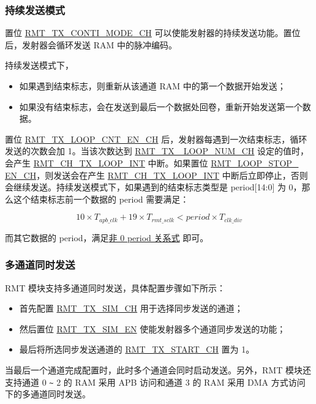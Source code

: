 \documentclass[main\_\_CN.tex]{subfiles}
\begin{document}
\subsubsection{持续发送模式}


置位 \hyperref[fielddesc:RMTTXCONTIMODECHN]{RMT\_TX\_CONTI\_MODE\_CH} 可以使能发射器的持续发送功能。置位后，发射器会循环发送 RAM 中的脉冲编码。

持续发送模式下，
\begin{itemize}
    \item 如果遇到结束标志，则重新从该通道 RAM 中的第一个数据开始发送；
    \item 如果没有结束标志，会在发送到最后一个数据处回卷，重新开始发送第一个数据。
\end{itemize}
置位 \hyperref[fielddesc:RMTTXLOOPCNTENCHN]{RMT\_TX\_LOOP\_CNT\_EN\_CH} 后，发射器每遇到一次结束标志，循环发送的次数会加 1。当该次数达到 \hyperref[fielddesc:RMTTXLOOPNUMCHN]{RMT\_TX \_LOOP\_NUM\_CH} 设定的值时，会产生 \hyperref[int:RMTCHnTXLOOPINT]{RMT\_CH\_TX\_LOOP\_INT} 中断。如果置位 \hyperref[fielddesc:RMTLOOPSTOPENCHN]{RMT\_LOOP\_STOP\_\\EN\_CH}，则发送会在产生 \hyperref[int:RMTCHnTXLOOPINT]{RMT\_CH\_TX\_LOOP\_INT} 中断后立即停止，否则会继续发送。持续发送模式下，如果遇到的结束标志类型是 period[14:0] 为 0，那么这个结束标志前一个数据的 period 需要满足：

\begin{equation}
10 \times T_{apb\_clk} + 19 \times T_{rmt\_sclk} < period \times T_{clk\_div}
\end{equation}

而其它数据的 period，满足\hyperref[eq:rmt-period-value]{非 0 period 关系式} 即可。


\subsubsection{多通道同时发送}

RMT 模块支持多通道同时发送，具体配置步骤如下所示：
\begin{itemize}
    \item 首先配置 \hyperref[fielddesc:RMTTXSIMCHN]{RMT\_TX\_SIM\_CH} 用于选择同步发送的通道；
    \item 然后置位 \hyperref[fielddesc:RMTTXSIMEN]{RMT\_TX\_SIM\_EN} 使能发射器多个通道同步发送的功能；
    \item 最后将所选同步发送通道的 \hyperref[fielddesc:RMTTXSTARTCHN]{RMT\_TX\_START\_CH} 置为 1。
\end{itemize}
当最后一个通道完成配置时，此时多个通道会同时启动发送。另外，RMT 模块还支持通道 0 \verb+~+ 2 的 RAM 采用 APB 访问和通道 3 的 RAM 采用 DMA 方式访问下的多通道同时发送。
\end{document}
